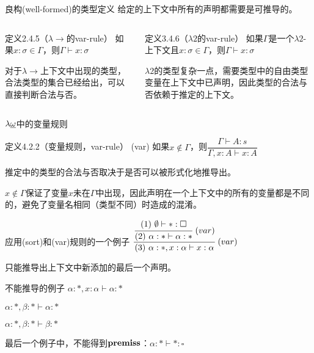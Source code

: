 \documentclass[UTF8,aspectratio=169,mathserif]{beamer}
\begin{document}
		\begin{frame}{良构(well-formed)的类型定义}
			给定的上下文中所有的声明都需要是可推导的。
			\begin{columns}
				\begin{column}{0.48\textwidth}
					\begin{block}{定义2.4.5（$\lambda{\rightarrow}$的var-rule）}
						如果$x:\sigma\in\Gamma$，则$\Gamma\vdash x:\sigma$
					\end{block}
					对于$\lambda{\rightarrow}$上下文中出现的类型，合法类型的集合已经给出，可以直接判断合法与否。
				\end{column}
				\begin{column}{0.48\textwidth}
					\begin{block}{定义3.4.6（$\lambda{2}$的var-rule）}
						如果$\Gamma$是一个$\lambda{2}$-上下文且$x:\sigma\in\Gamma$，则$\Gamma\vdash x:\sigma$
					\end{block}
					$\lambda{2}$的类型复杂一点，需要类型中的自由类型变量在上下文中已声明，因此类型的合法与否依赖于推定的上下文。
				\end{column}
			\end{columns}
		\end{frame}
		
		\begin{frame}{$\lambda{\uline{\omega}}$中的变量规则}
			\begin{exampleblock}{定义4.2.2（变量规则，var-rule）}
				(var) 如果$x\not\in\Gamma$，则$\dfrac{\Gamma\vdash A:s}{\Gamma,x:A\vdash x:A}$
			\end{exampleblock}
			推定中的类型的合法与否取决于是否可以被形式化地推导出。
			
			
			$x\not\in\Gamma$保证了变量$x$未在$\Gamma$中出现，因此声明在一个上下文中的所有的变量都是不同的，避免了变量名相同（类型不同）时造成的混淆。
		\end{frame}
	
		\begin{frame}
			\begin{block}{应用(sort)和(var)规则的一个例子}
				$\cfrac{\cfrac{(1)\ \emptyset\vdash*:\square}{(2)\ \alpha:*\vdash\alpha:*}\ (var)}{(3)\ \alpha:*,x:\alpha\vdash x:\alpha}\ (var)$
				
				只能推导出上下文中新添加的最后一个声明。
			\end{block}
		
			\begin{block}{不能推导的例子}
				$\alpha:*,x:\alpha\vdash\alpha:*$
				
				$\alpha:*,\beta:*\vdash\alpha:*$
				
				$\alpha:*,\beta:*\vdash\beta:*$
				
				最后一个例子中，不能得到$\bf premiss$：$\alpha:*\vdash*:\square$
			\end{block}
		\end{frame}
\end{document}
